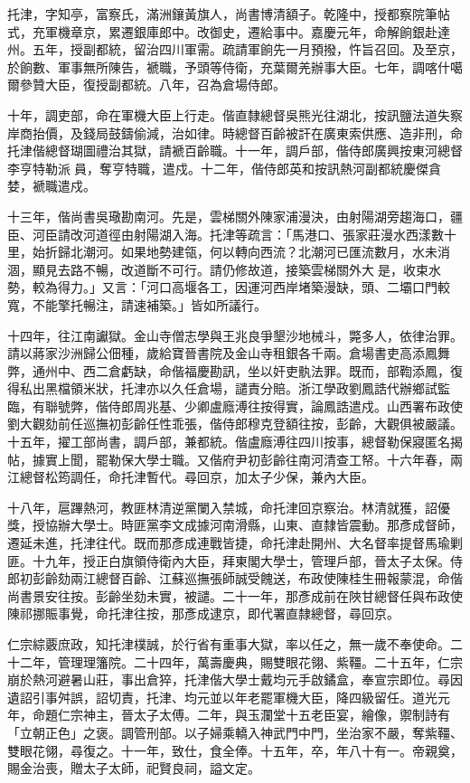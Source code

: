 \begin{pinyinscope}
托津，字知亭，富察氏，滿洲鑲黃旗人，尚書博清額子。乾隆中，授都察院筆帖式，充軍機章京，累遷銀庫郎中。改御史，遷給事中。嘉慶元年，命解餉銀赴達州。五年，授副都統，留治四川軍需。疏請軍餉先一月預撥，忤旨召回。及至京，於餉數、軍事無所陳告，褫職，予頭等侍衛，充葉爾羌辦事大臣。七年，調喀什噶爾參贊大臣，復授副都統。八年，召為倉場侍郎。

十年，調吏部，命在軍機大臣上行走。偕直隸總督吳熊光往湖北，按訊鹽法道失察岸商抬價，及錢局鼓鑄偷減，治如律。時總督百齡被訐在廣東索供應、造非刑，命托津偕總督瑚圖禮治其獄，請褫百齡職。十一年，調戶部，偕侍郎廣興按東河總督李亨特勒派員，奪亨特職，遣戍。十二年，偕侍郎英和按訊熱河副都統慶傑貪婪，褫職遣戍。

十三年，偕尚書吳璥勘南河。先是，雲梯關外陳家浦漫決，由射陽湖旁趨海口，疆臣、河臣請改河道徑由射陽湖入海。托津等疏言：「馬港口、張家莊漫水西漾數十里，始折歸北潮河。如果地勢建瓴，何以轉向西流？北潮河已匯流數月，水未消涸，顯見去路不暢，改道斷不可行。請仍修故道，接築雲梯關外大是，收束水勢，較為得力。」又言：「河口高堰各工，因運河西岸堵築漫缺，頭、二壩口門較寬，不能擎托暢注，請速補築。」皆如所議行。

十四年，往江南讞獄。金山寺僧志學與王兆良爭墾沙地械斗，斃多人，依律治罪。請以蔣家沙洲歸公佃種，歲給寶晉書院及金山寺租銀各千兩。倉場書吏高添鳳舞弊，通州中、西二倉虧缺，命偕福慶勘訊，坐以奸吏骫法罪。既而，部鞫添鳳，復得私出黑檔領米狀，托津亦以久任倉場，譴責分賠。浙江學政劉鳳誥代辦鄉試監臨，有聯號弊，偕侍郎周兆基、少卿盧廕溥往按得實，論鳳誥遣戍。山西署布政使劉大觀劾前任巡撫初彭齡任性乖張，偕侍郎穆克登額往按，彭齡，大觀俱被嚴議。十五年，擢工部尚書，調戶部，兼都統。偕盧廕溥往四川按事，總督勒保寢匿名揭帖，據實上聞，罷勒保大學士職。又偕府尹初彭齡往南河清查工帑。十六年春，兩江總督松筠調任，命托津暫代。尋回京，加太子少保，兼內大臣。

十八年，扈蹕熱河，教匪林清逆黨闌入禁城，命托津回京察治。林清就獲，詔優獎，授協辦大學士。時匪黨李文成據河南滑縣，山東、直隸皆震動。那彥成督師，遷延未進，托津往代。既而那彥成連戰皆捷，命托津赴開州、大名督率提督馬瑜剿匪。十九年，授正白旗領侍衛內大臣，拜東閣大學士，管理戶部，晉太子太保。侍郎初彭齡劾兩江總督百齡、江蘇巡撫張師誠受餽送，布政使陳桂生冊報蒙混，命偕尚書景安往按。彭齡坐劾未實，被譴。二十一年，那彥成前在陜甘總督任與布政使陳祁挪賑事覺，命托津往按，那彥成逮京，即代署直隸總督，尋回京。

仁宗綜覈庶政，知托津樸誠，於行省有重事大獄，率以任之，無一歲不奉使命。二十二年，管理理籓院。二十四年，萬壽慶典，賜雙眼花翎、紫韁。二十五年，仁宗崩於熱河避暑山莊，事出倉猝，托津偕大學士戴均元手啟鐍盒，奉宣宗即位。尋因遺詔引事舛誤，詔切責，托津、均元並以年老罷軍機大臣，降四級留任。道光元年，命題仁宗神主，晉太子太傅。二年，與玉瀾堂十五老臣宴，繪像，禦制詩有「立朝正色」之褒。調管刑部。以子婦乘轎入神武門中門，坐治家不嚴，奪紫韁、雙眼花翎，尋復之。十一年，致仕，食全俸。十五年，卒，年八十有一。帝親奠，賜金治喪，贈太子太師，祀賢良祠，謚文定。


\end{pinyinscope}
